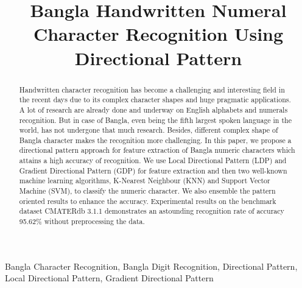 \documentclass[conference]{IEEEtran}
\begin{document}
\title{Bangla Handwritten Numeral Character Recognition Using Directional Pattern}


\author{
}


\maketitle


\begin{abstract}
Handwritten character recognition has become a challenging and interesting field in the recent days due to its complex character shapes and huge pragmatic applications. A lot of research are already done and underway on English alphabets and numerals recognition. But in case of Bangla, even being the fifth largest spoken language in the world, has not undergone that much research. Besides, different complex shape of Bangla character makes the recognition more challenging. In this paper, we propose a directional pattern approach for feature extraction of Bangla numeric characters which attains a high accuracy of recognition. We use Local Directional Pattern (LDP) and Gradient Directional Pattern (GDP) for feature extraction and then two well-known machine learning algorithms, K-Nearest Neighbour (KNN) and Support Vector Machine (SVM), to classify the numeric character. We also ensemble the pattern oriented results to enhance the accuracy. Experimental results on the benchmark dataset CMATERdb 3.1.1 demonstrates an astounding recognition rate of accuracy 95.62\% without preprocessing the data.
\end{abstract}

\begin{IEEEkeywords}
Bangla Character Recognition, Bangla Digit Recognition, Directional Pattern, Local Directional Pattern, Gradient Directional Pattern
\end{IEEEkeywords}
\end{document}
